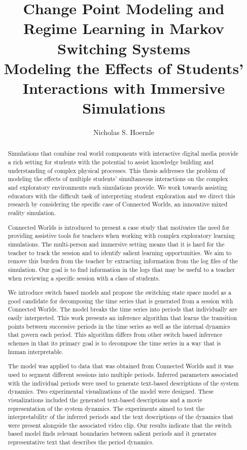 \documentclass[11pt]{gsasthesis} %
\title{Change Point Modeling and Regime Learning in Markov Switching Systems \\
\large Modeling the Effects of Students' Interactions with Immersive Simulations} %
\author{Nicholas S. Hoernle} %
\begin{document}


\thesistitlepage
\begin{abstract}
Simulations that combine real world components with interactive digital media provide a rich setting for students with the potential to assist knowledge building and understanding of complex physical processes. This thesis addresses the problem of modeling the effects of multiple students' simultaneous interactions on the complex and exploratory environments such simulations provide. We work towards assisting educators with the difficult task of interpreting student exploration and we direct this research by considering the specific case of Connected Worlds, an innovative mixed reality simulation. 

Connected Worlds is introduced to present a case study that motivates the need for providing assistive tools for teachers when working with complex exploratory learning simulations. The multi-person and immersive setting means that it is hard for the teacher to track the session and to identify salient learning opportunities. We aim to remove this burden from the teacher by extracting information from the log files of the simulation. Our goal is to find information in the logs that may be useful to a teacher when reviewing a specific session with a class of students.

We introduce switch based models and propose the switching state space model as a good candidate for decomposing the time series that is generated from a session with Connected Worlds. The model breaks the time series into periods that individually are easily interpreted. This work presents an inference algorithm that learns the transition points between successive periods in the time series as well as the internal dynamics that govern each period. This algorithm differs from other switch based inference schemes in that its primary goal is to decompose the time series in a way that is human interpretable.

The model was applied to data that was obtained from Connected Worlds and it was used to segment different sessions into multiple periods. Inferred parameters associated with the individual periods were used to generate text-based descriptions of the system dynamics. Two experimental visualizations of the model were designed. These visualizations included the generated text-based descriptions and a movie representation of the system dynamics. The experiments aimed to test the interpretability of the inferred periods and the text descriptions of the dynamics that were present alongside the associated video clip. Our results indicate that the switch based model finds relevant boundaries between salient periods and it generates representative text that describes the period dynamics.
\end{abstract}
\end{document}
